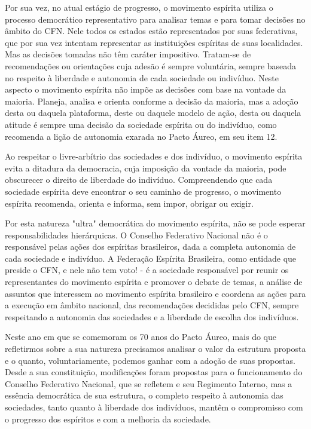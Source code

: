 Por sua vez, no atual estágio de progresso, o movimento espírita utiliza o processo democrático representativo para analisar temas e para tomar decisões no âmbito do CFN. Nele todos os estados estão representados por suas federativas, que por sua vez intentam representar as instituições espíritas de suas localidades. Mas as decisões tomadas não têm caráter impositivo. Tratam-se de recomendações ou orientações cuja adesão é sempre voluntária, sempre baseada no respeito à liberdade e autonomia de cada sociedade ou indivíduo. Neste aspecto o movimento espírita não impõe as decisões com base na vontade da maioria. Planeja, analisa e orienta conforme a decisão da maioria, mas a adoção desta ou daquela plataforma, deste ou daquele modelo de ação, desta ou daquela atitude é sempre uma decisão da sociedade espírita ou do indivíduo, como recomenda a lição de autonomia exarada no Pacto Áureo, em seu item 12.

Ao respeitar o livre-arbítrio das sociedades e dos indivíduo, o movimento espírita evita a ditadura da democracia, cuja imposição da vontade da maioria, pode obscurecer o direito de liberdade do indivíduo. Compreendendo que cada sociedade espírita deve encontrar o seu caminho de progresso, o movimento espírita recomenda, orienta e informa, sem impor, obrigar ou exigir. 

Por esta natureza "ultra" democrática do movimento espírita, não se pode esperar responsabilidades hierárquicas. O Conselho Federativo Nacional não é o responsável pelas ações dos espíritas brasileiros, dada a completa autonomia de cada sociedade e indivíduo. A Federação Espírita Brasileira, como entidade que preside o CFN, e nele não tem voto! - é a sociedade responsável por reunir os representantes do movimento espírita e promover o debate de temas, a análise de assuntos que interessem ao movimento espírita brasileiro e coordena as ações para a execução em âmbito nacional, das recomendações decididas pelo CFN, sempre respeitando a autonomia das sociedades e a liberdade de escolha dos indivíduos. 

Neste ano em que se comemoram os 70 anos do Pacto Áureo, mais do que refletirmos sobre a sua natureza precisamos analisar o valor da estrutura proposta e o quanto, voluntariamente, podemos ganhar com a adoção de suas propostas. Desde a sua constituição, modificações foram propostas para o funcionamento do Conselho Federativo Nacional, que se refletem e seu Regimento Interno, mas a essência democrática de sua estrutura, o completo respeito à autonomia das sociedades, tanto quanto  à liberdade dos indivíduos,  mantêm o compromisso com o progresso dos espíritos e com a melhoria da sociedade.

